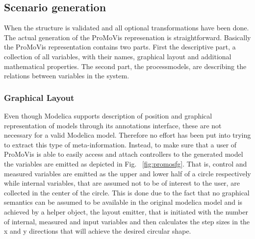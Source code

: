 \subsection{Scenario generation}
When the structure is validated and all optional transformations have been done. The actual generation of the ProMoVis represenation is straightforward. Basically the ProMoVis representation contains two parts. First the descriptive part, a collection of all variables, with their names, graphical layout and additional mathematical properties. The second part, the processmodels, are describing the relations between variables in the system. 
\subsubsection{Graphical Layout}
Even though Modelica supports description of position and graphical representation of models through its annotations interface, these are not necessary for a valid Modelica model. Therefore no effort has been put into trying to extract this type of meta-information. Instead, to make sure that a user of ProMoVis is able to easily access and attach controllers to the generated model the variables are emitted as depicted in Fig. ~\ref{fig:promosfg}. That is, control and measured variables are emitted as the upper and lower half of a circle respectively while internal variables, that are assumed not to be of interest to the user, are collected in the center of the circle. This is done due to the fact that no graphical semantics can be assumed to be available in the original modelica model and is achieved by a helper object, the layout emitter, that is initiated with the number of internal, measured and input variables and then calculates the step sizes in the x and y directions that will achieve the desired circular shape.
%
